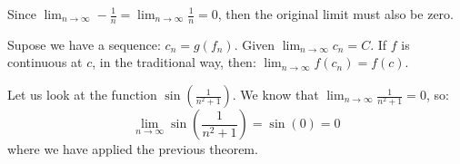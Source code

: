 \begin{itemize}
\begin{example}
\begin{equation}
        \end{equation}
        Since $\lim_{n\to\infty} -\frac{1}{n} = \lim_{n\to\infty}\frac{1}{n} = 0$, then the original limit must also be zero.
    \end{example}
    \begin{theorem}
        Supose we have a sequence: $c_n = g(f_n)$. Given $\lim_{n\to\infty}c_n = C$. If $f$ is continuous at $c$, in the traditional way, then: $\lim_{n\to\infty} f(c_n) = f(c)$.
    \end{theorem}
    \begin{example}
        Let us look at the function $\sin\left(\frac{1}{n^2+1}\right)$. We know that $\lim_{n\to\infty} \frac{1}{n^2+1}=0$, so:
        \begin{equation}
            \lim_{n\to\infty} \sin\left(\frac{1}{n^2+1}\right) = \sin(0) = 0
        \end{equation}
        where we have applied the previous theorem.
    \end{example}
\end{itemize}